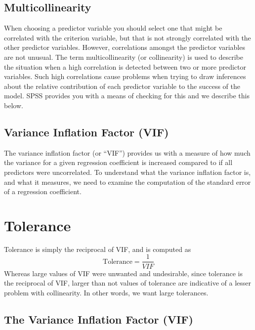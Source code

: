 \documentclass[a4paper,12pt]{article}
\begin{document}
\subsection{Multicollinearity}
When choosing a predictor variable you should select one that might be correlated with the criterion variable, but that is not strongly correlated with the other predictor variables. However, correlations amongst the predictor variables are not unusual. The term multicollinearity (or collinearity) is used to describe the situation
when a high correlation is detected between two or more predictor variables.
%
Such high correlations cause problems when trying to draw inferences about the relative contribution of each predictor variable to the success of the model. SPSS provides you with a means of checking for this and we describe this below.

\subsection{Variance Inflation Factor (VIF)}
%
The variance inflation factor (or “VIF”) provides us with a measure of how much the variance for a given regression coefficient is increased compared to if all predictors were uncorrelated. To understand what the variance inflation factor is, and what it measures, we need to examine the computation of the standard error of a regression coefficient.
%
\section{Tolerance}
%
Tolerance is simply the reciprocal of VIF, and is computed as
\[ \mbox{Tolerance} = \frac{1}{VIF}\]
Whereas large values of VIF were unwanted and undesirable, since tolerance is the reciprocal of VIF, larger than not values of tolerance are indicative of a lesser problem with collinearity. In other words, we want large tolerances.


\subsection{The Variance Inflation Factor (VIF)}
\end{document}
